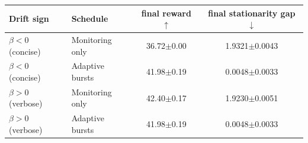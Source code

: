 \begin{tabular}{l l c c}
\toprule
Drift sign & Schedule & final reward $\uparrow$ & final stationarity gap $\downarrow$\\
\midrule
$\beta<0$ (concise) & Monitoring only & 36.72$\pm$0.00 & 1.9321$\pm$0.0043\\
$\beta<0$ (concise) & Adaptive bursts & 41.98$\pm$0.19 & 0.0048$\pm$0.0033\\
\midrule
$\beta>0$ (verbose) & Monitoring only & 42.40$\pm$0.17 & 1.9230$\pm$0.0051\\
$\beta>0$ (verbose) & Adaptive bursts & 41.98$\pm$0.19 & 0.0048$\pm$0.0033\\
\bottomrule
\end{tabular}
